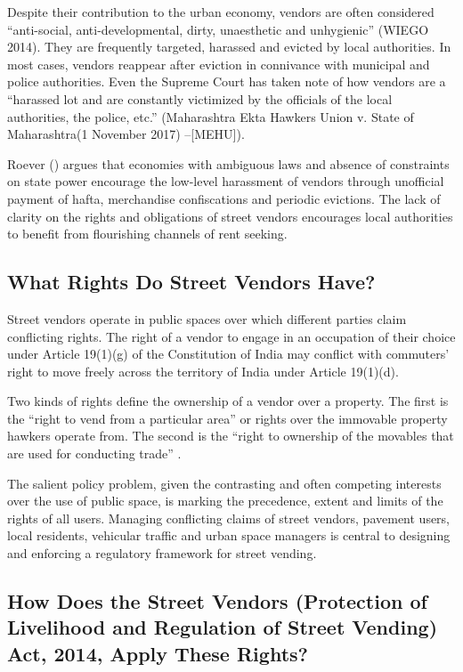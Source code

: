 \documentclass[a4paper, 12pt, twoside]{article}
\begin{document}
{Despite their contribution to the urban economy, vendors are often considered “anti-social, anti-developmental, dirty, unaesthetic and unhygienic” (WIEGO 2014). They are frequently targeted, harassed and evicted by local authorities. In most cases, vendors reappear after eviction in connivance with municipal and police authorities. Even the Supreme Court has taken note of how vendors are a “harassed lot and are constantly victimized by the officials of the local authorities, the police, etc.” (Maharashtra Ekta Hawkers Union v. State of Maharashtra(1 November 2017) –[MEHU]).

Roever (\cite*{sallypaper}) argues that economies with ambiguous laws and absence of constraints on state power encourage the low-level harassment of vendors through unofficial payment of hafta, merchandise confiscations and periodic evictions. The lack of clarity on the rights and obligations of street vendors encourages local authorities to benefit from flourishing channels of rent seeking.

\subsection*{What Rights Do Street Vendors Have?}
Street vendors operate in public spaces over which different parties claim conflicting rights. The right of a vendor to engage in an occupation of their choice under Article 19(1)(g) of the Constitution of India may conflict with commuters’ right to move freely across the territory of India under Article 19(1)(d).

Two kinds of rights define the ownership of a vendor over a property. The first is the “right to vend from a particular area” or rights over the immovable property hawkers operate from. The second is the “right to ownership of the movables that are used for conducting trade” \parencite{ccspaper}.

The salient policy problem, given the contrasting and often competing interests over the use of public space, is marking the precedence, extent and limits of the rights of all users. Managing conflicting claims of street vendors, pavement users, local residents, vehicular traffic and urban space managers is central to designing and enforcing a regulatory framework for street vending.

\subsection*{How Does the Street Vendors (Protection of Livelihood and Regulation of Street Vending) Act, 2014, Apply These Rights?}

}
\end{document}
